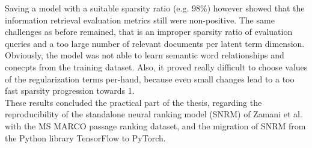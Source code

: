 Saving a model with a suitable sparsity ratio (e.g. 98\%) however showed that the information retrieval
    evaluation metrics still were non-positive.
The same challenges as before remained, that is an improper sparsity ratio of evaluation queries and 
    a too large number of relevant documents per latent term dimension.
    Obviously, the model was not able to learn semantic word relationships and conecpts 
    from the training dataset.
Also, it proved really difficult to choose values of the regularization terms per-hand, because 
    even small changes lead to a too fast sparsity progression towards 1.\\
These results concluded the practical part of the thesis, regarding the reproducibility of the 
    standalone neural ranking model (SNRM) of
    Zamani et al. \cite{zamani:2018:from-neural-reranking-to-neural-ranking}
    with the MS MARCO passage ranking dataset, 
    and the migration of SNRM from the Python library TensorFlow to PyTorch.
